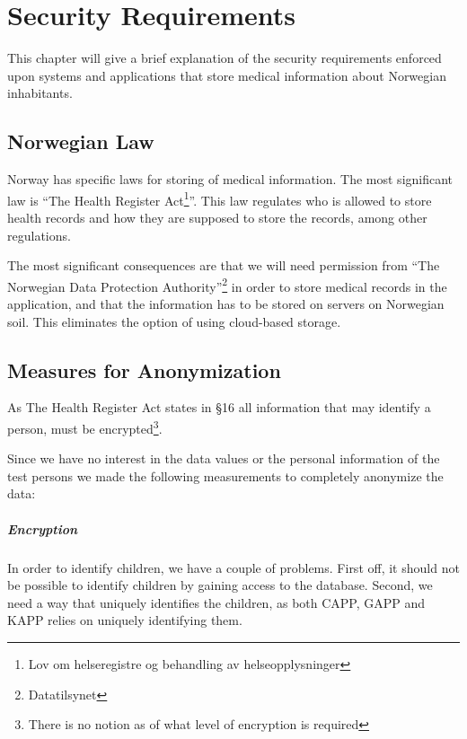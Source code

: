 \chapter{Security Requirements}
\label{chp:securityrequirements}

This chapter will give a brief explanation of the security requirements enforced upon systems and applications that store medical information about Norwegian inhabitants. 


\section{Norwegian Law}
\label{sec:helseregisterloven}

Norway has specific laws for storing of medical information. The most significant law is ``The Health Register Act\footnote{Lov om helseregistre og behandling av helseopplysninger}''\cite{helseregisterloven}. This law regulates who is allowed to store health records and how they are supposed to store the records, among other regulations. 

The most significant consequences are that we will need permission from ``The Norwegian Data Protection Authority''\footnote{Datatilsynet} in order to store medical records in the application, and that the information has to be stored on servers on Norwegian soil. This eliminates the option of using cloud-based storage. 


\section{Measures for Anonymization}
As The Health Register Act states in \S 16 \cite{helseregisterloven} all information that may identify a person, must be encrypted\footnote{There is no notion as of what level of encryption is required}. 

Since we have no interest in the data values or the personal information of the test persons we made the following measurements to completely anonymize the data:

\paragraph{Encryption}
In order to identify children, we have a couple of problems. First off, it should not be possible to identify children by gaining access to the database. Second, we need a way that uniquely identifies the children, as both CAPP, GAPP and KAPP relies on uniquely identifying them. 


